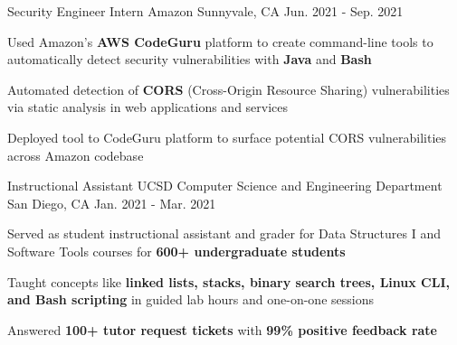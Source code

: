 \begin{cventries}
\cventry
  {Security Engineer Intern} %
  {Amazon} %
  {Sunnyvale, CA} %
  {Jun. 2021 - Sep. 2021} %
  {
    \begin{cvitems} %
      \item {Used Amazon's \textbf{AWS CodeGuru} platform to create command-line tools to automatically detect security vulnerabilities with \textbf{Java} and \textbf{Bash}}
      \item {Automated detection of \textbf{CORS} (Cross-Origin Resource Sharing) vulnerabilities via static analysis in web applications and services}
      \item {Deployed tool to CodeGuru platform to surface potential CORS vulnerabilities across Amazon codebase}
    \end{cvitems}
  }

  \cventry
    {Instructional Assistant} %
    {UCSD Computer Science and Engineering Department} %
    {San Diego, CA} %
    {Jan. 2021 - Mar. 2021} %
    {
      \begin{cvitems} %
        \item {Served as student instructional assistant and grader for Data Structures I and Software Tools courses for \textbf{600+ undergraduate students}}
        \item {Taught concepts like \textbf{linked lists, stacks, binary search trees, Linux CLI, and Bash scripting} in guided lab hours and one-on-one sessions}
        \item {Answered \textbf{100+ tutor request tickets} with \textbf{99\% positive feedback rate}}
      \end{cvitems}
    }



\end{cventries}
